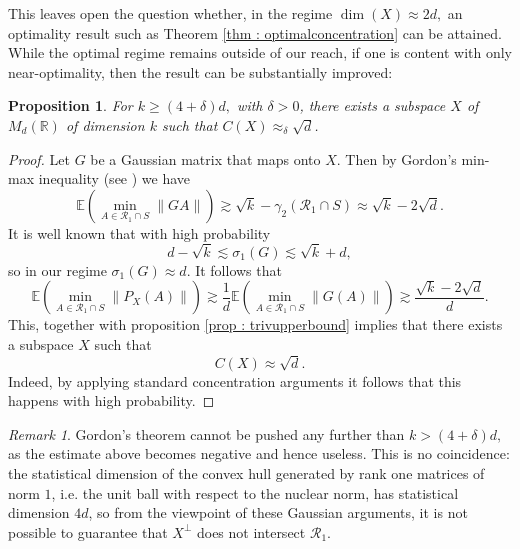 \documentclass[11pt, a4paper, reqno]{elsarticle}
\newtheorem{proposition}{Proposition}[section]
\theoremstyle{definition}
\theoremstyle{remark}
\newtheorem{remark}{Remark}
\begin{document}
This leaves open the question whether, in the regime
$\dim(X)\approx 2 d,$ an optimality result such as Theorem
\ref{thm : optimalconcentration} can be attained. While the optimal regime
remains outside of our reach, if one is content
with only near-optimality, then the
result can be substantially improved:
\begin{proposition}
    For $k\ge (4+\delta)d,$ with $\delta>0$, there exists
    a subspace $X$ of $M_d(\mathbb R)$ of dimension $k$
    such that $C(X)\approx_\delta \sqrt d$.
\end{proposition}
\begin{proof}
    Let $G$ be a Gaussian matrix
    that maps onto $X$. Then 
    by Gordon's min-max inequality (see \cite[Theorem A, corollary 1.2]{Gordon})
    we have
    \begin{equation*}
        \mathbb E\left(\min_{A\in \mathcal R_1\cap S}\| GA\|\right)\gtrsim 
        \sqrt k-\gamma_2(\mathcal R_1\cap S)
        \approx \sqrt k-2\sqrt d.
    \end{equation*}
    It is well known that with high probability
    \begin{equation*}
        d-\sqrt k \lesssim \sigma_1(G)\lesssim \sqrt{k}+d,
    \end{equation*}
    so in our regime $\sigma_1(G)\approx d$.
    It follows that
    \begin{equation*}
        \mathbb E\left(\min_{A\in\mathcal R_1\cap S}\|P_X(A)\|\right)\gtrsim\frac{1}{d} \mathbb E\left(\min_{A\in\mathcal R_1\cap S}\|G(A)\|\right)
        \gtrsim\frac{\sqrt{k}-2\sqrt d}{d}.
    \end{equation*}
    This, together with proposition \ref{prop : trivupperbound} implies that there exists a subspace
    $X$ such that
    \begin{equation*}
        C(X)\approx \sqrt d.
    \end{equation*}
    Indeed, by applying standard concentration arguments
    it follows that this happens with high probability.
\end{proof}
\begin{remark}
    Gordon's theorem cannot be pushed any 
    further than $k>(4+\delta) d,$ as the estimate
    above becomes negative and hence useless. This
    is no coincidence: the statistical dimension of the convex hull
    generated by rank one matrices of norm $1$, i.e. the unit ball with respect to the
    nuclear norm, has statistical dimension $4d$, so from the viewpoint of
    these Gaussian arguments, it is not possible to guarantee that $X^\perp$
    does not intersect $\mathcal R_1$.
\end{remark}
\end{document}
